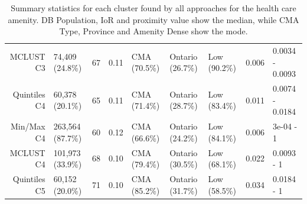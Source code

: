 \documentclass[11pt, a4paper]{article}
\begin{document}
\begin{table}[H]
{\begin{tabular}{|r|llllllll|}
  MCLUST C3 & 74,409 (24.8\%) & 67 & 0.11 & CMA (70.5\%) & Ontario (26.7\%) & Low (90.2\%) & 0.006 & 0.0034 - 0.0093 \\ 
  Quintiles C4 & 60,378 (20.1\%) & 65 & 0.11 & CMA (71.4\%) & Ontario (28.7\%) & Low (83.4\%) & 0.011 & 0.0074 - 0.0184 \\ 
  Min/Max C4 & 263,564 (87.7\%) & 60 & 0.12 & CMA (66.6\%) & Ontario (24.2\%) & Low (84.1\%) & 0.006 & 3e-04 - 1 \\ 
  MCLUST C4 & 101,973 (33.9\%) & 68 & 0.10 & CMA (79.4\%) & Ontario (30.5\%) & Low (68.1\%) & 0.022 & 0.0093 - 1 \\ 
  Quintiles C5 & 60,152 (20.0\%) & 71 & 0.10 & CMA (85.2\%) & Ontario (31.7\%) & Low (58.5\%) & 0.034 & 0.0184 - 1 \\ 
   \hline
\end{tabular}
}
\caption[Health care cluster profiles]{Summary statistics for each cluster found by all approaches for the health care amenity. DB Population, IoR and proximity value show the median, while CMA Type, Province and Amenity Dense show the mode.}\label{healthcareprofiles}
\end{table}
\end{document}

